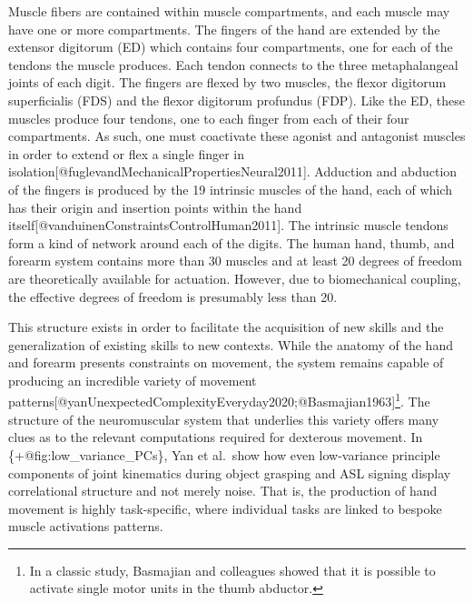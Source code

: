 \documentclass[../main.tex]{subfiles}
\begin{document}
Muscle fibers are contained within muscle compartments, and each muscle may have one or more compartments. The fingers of the hand are extended by the extensor digitorum (ED) which contains four compartments, one for each of the tendons the muscle produces. Each tendon connects to the three metaphalangeal joints of each digit. The fingers are flexed by two muscles, the flexor digitorum superficialis (FDS) and the flexor digitorum profundus (FDP). Like the ED, these muscles produce four tendons, one to each finger from each of their four compartments. As such, one must coactivate these agonist and antagonist muscles in order to extend or flex a single finger in isolation{[}@fuglevandMechanicalPropertiesNeural2011{]}. Adduction and abduction of the fingers is produced by the 19 intrinsic muscles of the hand, each of which has their origin and insertion points within the hand itself{[}@vanduinenConstraintsControlHuman2011{]}. The intrinsic muscle tendons form a kind of network around each of the digits. The human hand, thumb, and forearm system contains more than 30 muscles and at least 20 degrees of freedom are theoretically available for actuation. However, due to biomechanical coupling, the effective degrees of freedom is presumably less than 20.

This structure exists in order to facilitate the acquisition of new skills and the generalization of existing skills to new contexts. While the anatomy of the hand and forearm presents constraints on movement, the system remains capable of producing an incredible variety of movement patterns{[}@yanUnexpectedComplexityEveryday2020;@Basmajian1963{]}\footnote{In   a classic study, Basmajian and colleagues showed that it is possible   to activate single motor units in the thumb abductor.}. The structure of the neuromuscular system that underlies this variety offers many clues as to the relevant computations required for dexterous movement. In \{+@fig:low\_variance\_PCs\}, Yan et al.~show how even low-variance principle components of joint kinematics during object grasping and ASL signing display correlational structure and not merely noise. That is, the production of hand movement is highly task-specific, where individual tasks are linked to bespoke muscle activations patterns.
\end{document}
